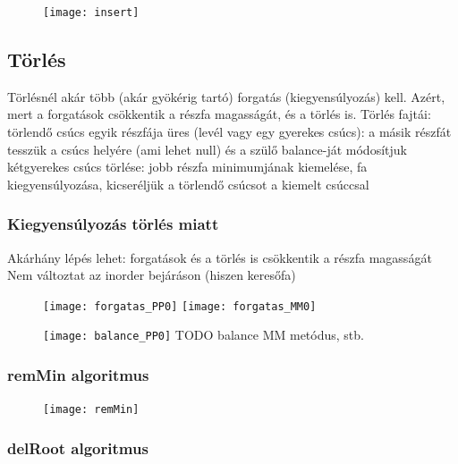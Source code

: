 \documentclass[12pt,a4paper]{article}
\begin{document}
\begin{figure}[h!]
	\centering
	\texttt{[image: insert]}
\end{figure}

\pagebreak

\subsection{Törlés}

\begin{outline}
	\1 Törlésnél akár több (akár gyökérig tartó) forgatás (kiegyensúlyozás) kell.
	Azért, mert a forgatások csökkentik a részfa magasságát, és a törlés is.
	\1 Törlés fajtái:
		\2 törlendő csúcs egyik részfája üres (levél vagy egy gyerekes csúcs):
		a másik részfát tesszük a csúcs helyére (ami lehet null) és a szülő balance-ját módosítjuk
		\2 kétgyerekes csúcs törlése: jobb részfa minimumjának kiemelése, fa kiegyensúlyozása,
		kicseréljük a törlendő csúcsot a kiemelt csúccsal
\end{outline}

\subsubsection{Kiegyensúlyozás törlés miatt}

\begin{outline}
	\1 Akárhány lépés lehet: forgatások és a törlés is csökkentik a részfa magasságát
	\2 Nem változtat az inorder bejáráson (hiszen keresőfa)
\end{outline}

\begin{figure}[h!]
	\centering
	\texttt{[image: forgatas\_PP0]}
	\texttt{[image: forgatas\_MM0]}
\end{figure}

\begin{figure}[h!]
	\centering
	\texttt{[image: balance\_PP0]}
	TODO balance MM metódus, stb.
\end{figure}

\subsubsection{remMin algoritmus}

\begin{figure}[h!]
	\centering
	\texttt{[image: remMin]}
\end{figure}

\pagebreak

\subsubsection{delRoot algoritmus}
\end{document}
